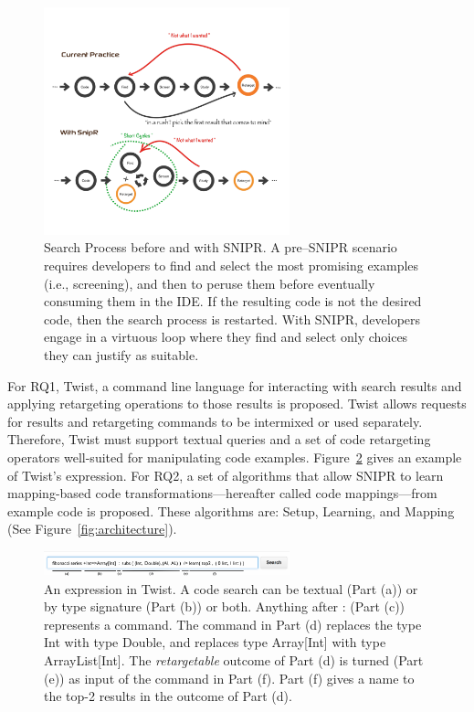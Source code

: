 \documentclass[conference]{IEEEtran}
\begin{document}
\begin{figure}[!t]
    \centering
    \includegraphics[width=2.8in]{images/searchprocess}
    \caption{Search Process before and with \uppercase{SnipR}. A pre--\uppercase{SnipR} scenario requires developers to find and select the most promising examples (i.e., screening), and then to peruse them before eventually consuming them in the IDE. If the resulting code is not the desired code, then the search process is restarted. With \uppercase{SnipR}, developers engage in a virtuous loop where they find and select only choices they can justify as suitable.}
    \label{fig:retargeting}
\end{figure}
For RQ1, Twist, a command line language for interacting with search results and applying retargeting operations to those results is proposed. Twist allows requests for results and retargeting commands to be intermixed or used separately. Therefore, Twist must support textual queries and a set of code retargeting operators well-suited for manipulating code examples. Figure~\ref{fig:twistcmd} gives an example of Twist's expression. For RQ2, a set of algorithms that allow \uppercase{SNIPR} to learn mapping-based code transformations---hereafter called code mappings---from example code is proposed. These algorithms are: Setup, Learning, and Mapping (See Figure~\ref{fig:architecture}).  

 \begin{figure}[!t]
    \centering
    \includegraphics[width=2.8in]{images/twistcmd}
    \caption{An expression in Twist. A code search can be textual (Part (a)) or by type signature (Part (b)) or both. Anything after : (Part (c)) represents a command. The command in Part (d) replaces the type Int with type Double, and replaces type Array[Int] with type ArrayList[Int]. The \emph{retargetable} outcome of Part (d) is turned (Part (e)) as input of the command in Part (f). Part (f) gives a name to the top-2 results in the outcome of Part (d).}
    \label{fig:twistcmd}
\end{figure}
\end{document}
